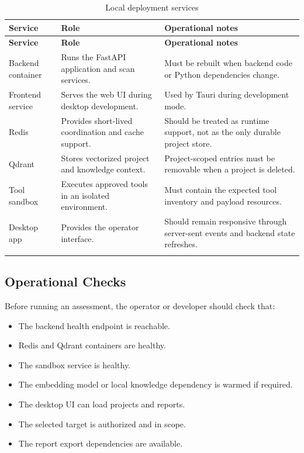 \documentclass[12pt,a4paper]{report}
\begin{document}
\begin{longtable}{|p{}|p{}|p{}|}
\hline
\textbf{Service} & \textbf{Role} & \textbf{Operational notes} \\
\hline
\endfirsthead
\hline
\textbf{Service} & \textbf{Role} & \textbf{Operational notes} \\
\hline
\endhead
Backend container & Runs the FastAPI application and scan services. & Must be rebuilt
when backend code or Python dependencies change. \\
\hline
Frontend service & Serves the web UI during desktop development. & Used by Tauri during
development mode. \\
\hline
Redis & Provides short-lived coordination and cache support. & Should be treated as
runtime support, not as the only durable project store. \\
\hline
Qdrant & Stores vectorized project and knowledge context. & Project-scoped entries
must be removable when a project is deleted. \\
\hline
Tool sandbox & Executes approved tools in an isolated environment. & Must contain the
expected tool inventory and payload resources. \\
\hline
Desktop app & Provides the operator interface. & Should remain responsive through
server-sent events and backend state refreshes. \\
\hline
\caption{Local deployment services}
\label{tab:deployment_services}
\end{longtable}

\subsection*{Operational Checks}

Before running an assessment, the operator or developer should check that:

\begin{itemize}
    \item The backend health endpoint is reachable.
    \item Redis and Qdrant containers are healthy.
    \item The sandbox service is healthy.
    \item The embedding model or local knowledge dependency is warmed if required.
    \item The desktop UI can load projects and reports.
    \item The selected target is authorized and in scope.
    \item The report export dependencies are available.
\end{itemize}
\end{document}
